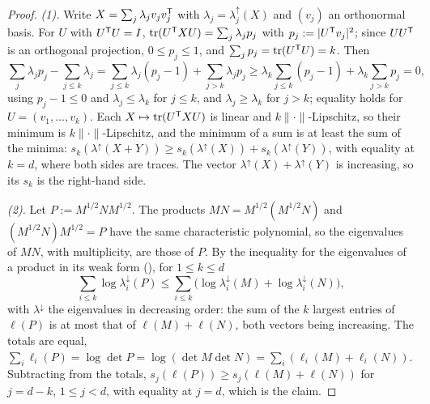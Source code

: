 \begin{proof}
\leanok
\emph{(1).} Write $X = \sum_j\lambda_jv_jv_j^{\mathsf{T}}$ with $\lambda_j = \lambda^\uparrow_j(X)$ and $(v_j)$ an
orthonormal basis. For $U$ with $U^{\mathsf{T}}U = I$, $\operatorname{tr}(U^{\mathsf{T}}XU) = \sum_j\lambda_jp_j$ with
$p_j := |U^{\mathsf{T}}v_j|^2$; since $UU^{\mathsf{T}}$ is an orthogonal projection, $0 \le p_j \le 1$, and
$\sum_jp_j = \operatorname{tr}(U^{\mathsf{T}}U) = k$. Then
\[
  \sum_j\lambda_jp_j - \sum_{j\le k}\lambda_j = \sum_{j\le k}\lambda_j(p_j - 1) + \sum_{j>k}\lambda_jp_j
  \ge \lambda_k\sum_{j\le k}(p_j - 1) + \lambda_k\sum_{j>k}p_j = 0 ,
\]
using $p_j - 1 \le 0$ and $\lambda_j \le \lambda_k$ for $j \le k$, and $\lambda_j \ge \lambda_k$ for
$j > k$; equality holds for $U = (v_1, \dots, v_k)$. Each $X \mapsto \operatorname{tr}(U^{\mathsf{T}}XU)$ is linear and
$k\|\cdot\|$-Lipschitz, so their minimum is $k\|\cdot\|$-Lipschitz, and the minimum of a sum is at least
the sum of the minima: $s_k(\lambda^\uparrow(X+Y)) \ge s_k(\lambda^\uparrow(X)) +
s_k(\lambda^\uparrow(Y))$, with equality at $k = d$, where both sides are traces. The vector
$\lambda^\uparrow(X) + \lambda^\uparrow(Y)$ is increasing, so its $s_k$ is the right-hand side.

\emph{(2).} Let $P := M^{1/2}NM^{1/2}$. The products $MN = M^{1/2}(M^{1/2}N)$ and $(M^{1/2}N)M^{1/2} = P$
have the same characteristic polynomial, so the eigenvalues of $MN$, with multiplicity, are those of $P$.
By the inequality for the eigenvalues of a product in its weak form (), for $1 \le k \le d$
\[
  \sum_{i\le k}\log\lambda^\downarrow_i(P) \le \sum_{i\le k}\bigl(\log\lambda^\downarrow_i(M) +
  \log\lambda^\downarrow_i(N)\bigr) ,
\]
with $\lambda^\downarrow$ the eigenvalues in decreasing order: the sum of the $k$ largest entries of
$\ell(P)$ is at most that of $\ell(M) + \ell(N)$, both vectors being increasing. The totals are equal,
$\sum_i\ell_i(P) = \log\det P = \log(\det M\det N) = \sum_i(\ell_i(M) + \ell_i(N))$. Subtracting from the
totals, $s_j(\ell(P)) \ge s_j(\ell(M) + \ell(N))$ for $j = d - k$, $1 \le j < d$, with equality at $j = d$,
which is the claim.


\end{proof}
